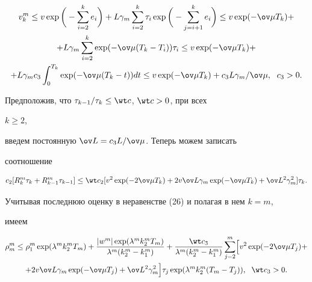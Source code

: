 \begin{multline*}


v_k^m \leq v\exp\bigg(-\sum_{i=2}^ke_i\bigg)+L\gamma_m\sum_{i=2}^k\tau_i


\exp\bigg(-\sum_{j=i+1}^ke_i\bigg)\leq v\exp(-\ov \mu T_k)+ \\


%


+L\gamma_m\sum_{i=2}^k\exp(-\ov \mu (T_k-T_i))\tau_i\leq


v\exp(-\ov\mu T_k)+ \\


%


+L\gamma_mc_3\int_0^{T_k}


\exp(-\ov \mu (T_k-t))dt \leq v\exp(-\ov \mu T_k)+c_3L\gamma_m/\ov\mu,


\ \; c_3>0.


\end{multline*}


Предположив, что $\tau_{k-1}/\tau_k \leq \wt c$, $\wt c>0$, при всех


$k\geq 2$,


введем постоянную $\ov L=c_3L/\ov \mu$. Теперь можем записать


соотношение


$$


c_2[R_k^m\tau_k+R_{k-1}^m\tau_{k-1}]\leq \wt c_2[v^2


\exp(-2\ov \mu T_k)+2 v\ov L\gamma_m\exp(-\ov \mu T_k)+\ov L^2\gamma_m^2]


\tau_k.


$$


Учитывая последнюю оценку в неравенстве (26) и полагая в нем $k=m$,


имеем


\begin{multline}\label{28}


\rho_m^m\leq \rho_1^m \exp(\lambda^mk_2^mT_m)+


\frac{|w^m|\exp(\lambda^mk_2^mT_m)}


{\lambda^m(k_2^m-k_1^m)}+ 


\frac{\wt c_3}{\lambda^m(k_2^m-k_1^m)}


\sum_{j=2}^m\Bigl[v^2\exp(-2\ov \mu T_j)+ \\


%


+2 v\ov L \gamma_m\exp(-\ov \mu T_j)+ 


\ov L^2\gamma_m^2\Bigr]\tau_j\exp(\lambda^mk_2^m(T_m-T_j)),\ \;\wt


c_3 >0.


\end{multline}


